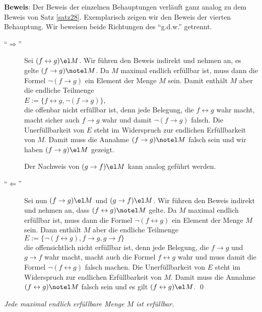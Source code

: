 \noindent
\textbf{Beweis}:  Der Beweis der einzelnen Behauptungen verläuft ganz analog zu dem Beweis
von Satz \ref{satz28}.  Exemplarisch zeigen wir den Beweis der vierten Behauptung.
Wir beweisen beide  Richtungen des ``g.d.w.'' getrennt.
\begin{description}
\item[``$\Rightarrow$''] Sei $(f \leftrightarrow g) \el M$.  Wir führen den Beweis indirekt und
  nehmen an, es gelte $(f \rightarrow g) \notel M$. Da
  $M$ maximal endlich erfüllbar ist, muss dann die Formel $\neg (f \rightarrow g)$ ein Element der Menge
  $M$ sein.  Damit enthält $M$ aber die endliche Teilmenge 
  \\[0.2cm]
  \hspace*{1.3cm}
  $E := \{ f \leftrightarrow g, \neg (f \rightarrow g)\}$, 
  \\[0.2cm]
  die offenbar nicht erfüllbar ist, denn jede Belegung, die $f \leftrightarrow g$ wahr macht, macht
  sicher auch $f \rightarrow g$ wahr und damit $\neg (f \rightarrow g)$ falsch.  Die
  Unerfüllbarkeit von $E$ steht im 
  Widerspruch zur endlichen Erfüllbarkeit von $M$.  Damit muss die Annahme $(f \rightarrow g) \notel M$
  falsch sein und wir haben $(f \rightarrow g) \el M$ gezeigt. 

  Der Nachweis von $(g \rightarrow f) \el M$ kann analog geführt werden.
\item[``$\Leftarrow$''] Sei nun $(f \rightarrow g) \el M$ und $(g \rightarrow f) \el M$.  
  Wir führen den Beweis indirekt und nehmen an, dass $(f \leftrightarrow g) \notel M$ gelte.  Da $M$
  maximal endlich erfüllbar ist, muss dann die Formel $\neg (f \leftrightarrow g)$ ein Element der
  Menge $M$ sein.  Dann enthält $M$ aber die endliche Teilmenge
  \\[0.2cm]
  \hspace*{1.3cm}
  $E := \{ \neg (f \leftrightarrow g), f \rightarrow g, g \rightarrow f \}$
  \\[0.2cm]
  die offensichtlich nicht erfüllbar ist, denn jede Belegung, die $f \rightarrow g$ und $g
  \rightarrow f$ wahr macht,
  macht auch die Formel $f \leftrightarrow g$ wahr und muss damit die Formel $\neg (f \leftrightarrow g)$
  falsch machen.  Die Unerfüllbarkeit von $E$ steht im Widerspruch zur endlichen
  Erfüllbarkeit von $M$.  Damit muss die Annahme $(f \leftrightarrow g) \notel M$ falsch sein und
  es gilt $(f \leftrightarrow g) \el M$. \qed
\end{description}

\begin{Satz} \label{satz30}
{\em
  Jede maximal endlich erfüllbare Menge $M$ ist erfüllbar.
}
\end{Satz}

